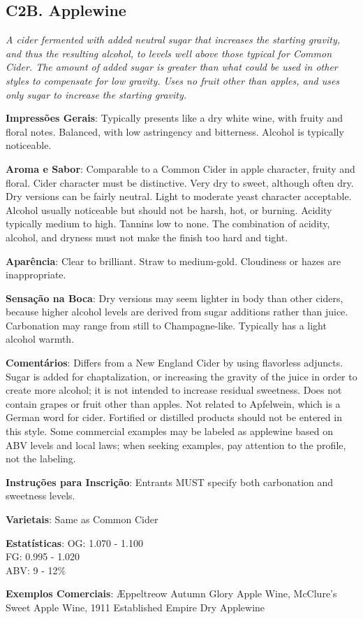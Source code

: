 \subsection*{C2B. Applewine}

\textit{A cider fermented with added neutral sugar that increases the starting gravity, and thus the resulting alcohol, to levels well above those typical for Common Cider. The amount of added sugar is greater than what could be used in other styles to compensate for low gravity. Uses no fruit other than apples, and uses only sugar to increase the starting gravity.}

\textbf{Impressões Gerais}: Typically presents like a dry white wine, with fruity and floral notes. Balanced, with low astringency and bitterness. Alcohol is typically noticeable.

\textbf{Aroma e Sabor}: Comparable to a Common Cider in apple character, fruity and floral. Cider character must be distinctive. Very dry to sweet, although often dry. Dry versions can be fairly neutral. Light to moderate yeast character acceptable. Alcohol usually noticeable but should not be harsh, hot, or burning. Acidity typically medium to high. Tannins low to none. The combination of acidity, alcohol, and dryness must not make the finish too hard and tight.

\textbf{Aparência}: Clear to brilliant. Straw to medium-gold. Cloudiness or hazes are inappropriate.

\textbf{Sensação na Boca}: Dry versions may seem lighter in body than other ciders, because higher alcohol levels are derived from sugar additions rather than juice. Carbonation may range from still to Champagne-like. Typically has a light alcohol warmth.

\textbf{Comentários}: Differs from a New England Cider by using flavorless adjuncts. Sugar is added for chaptalization, or increasing the gravity of the juice in order to create more alcohol; it is not intended to increase residual sweetness. Does not contain grapes or fruit other than apples. Not related to Apfelwein, which is a German word for cider. Fortified or distilled products should not be entered in this style. Some commercial examples may be labeled as applewine based on ABV levels and local laws; when seeking examples, pay attention to the profile, not the labeling.

\textbf{Instruções para Inscrição}: Entrants MUST specify both carbonation and sweetness levels.

\textbf{Varietais}: Same as Common Cider

\textbf{Estatísticas}: OG: 1.070 - 1.100 \\
\phantom{ } \hspace{16.5mm} FG: 0.995 - 1.020 \\
\phantom{ } \hspace{16.5mm} ABV: 9 - 12\%

\textbf{Exemplos Comerciais}: Æppeltreow Autumn Glory Apple Wine, McClure’s Sweet Apple Wine, 1911 Established Empire Dry Applewine
